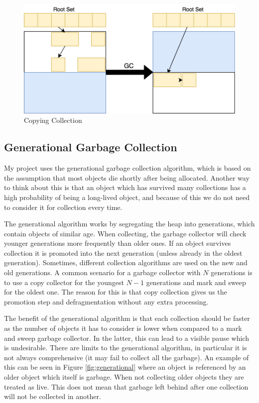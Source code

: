 \documentclass[../diss.tex]{subfiles}
\begin{document}
\begin{figure}
    \centering
    \includegraphics[max width=\linewidth]{figs/copycollection.png}
    \caption{Copying Collection}
    \label{fig:copyingcollection}
\end{figure}

\subsection{Generational Garbage Collection} \label{sec:generationalgarbagecollection}

My project uses the generational garbage collection algorithm\cite{generational}, which is based on the assumption that most objects die shortly after being allocated. Another way to think about this is that an object which has survived many collections has a high probability of being a long-lived object, and because of this we do not need to consider it for collection every time.

The generational algorithm works by segregating the heap into generations, which contain objects of similar age. When collecting, the garbage collector will check younger generations more frequently than older ones. If an object survives collection it is promoted into the next generation (unless already in the oldest generation). Sometimes, different collection algorithms are used on the new and old generations. A common scenario for a garbage collector with $N$ generations is to use a copy collector for the youngest $N-1$ generations and mark and sweep for the oldest one. The reason for this is that copy collection gives us the promotion step and defragmentation without any extra processing.

The benefit of the generational algorithm is that each collection should be faster as the number of objects it has to consider is lower when compared to a mark and sweep garbage collector. In the latter, this can lead to a visible pause which is undesirable. There are limits to the generational algorithm, in particular it is not always comprehensive (it may fail to collect all the garbage). An example of this can be seen in Figure \ref{fig:generational} where an object is referenced by an older object which itself is garbage. When not collecting older objects they are treated as live. This does not mean that garbage left behind after one collection will not be collected in another.
\end{document}

